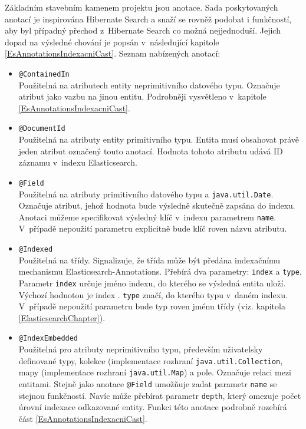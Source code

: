 \documentclass[11pt,oneside]{fithesis2}
\begin{document}
Základním stavebním kamenem projektu jsou anotace. Sada poskytovaných anotací je inspirována Hibernate Search a snaží se rovněž podobat i funkčností, aby byl případný přechod z~Hibernate Search co možná nejjednoduší. Jejich dopad na výsledné chování je popsán v~následující kapitole \ref{EsAnnotationsIndexacniCast}. Seznam nabízených anotací:
\begin{itemize}
	\item \texttt{@ContainedIn} \\
	Použitelná na atributech entity neprimitivního datového typu. Označuje atribut jako vazbu na jinou entitu. Podrobněji vysvětleno v~kapitole \ref{EsAnnotationsIndexacniCast}.

	\item \texttt{@DocumentId} \\
	Použitelná na atributy entity primitivního typu. Entita musí obsahovat právě jeden atribut označený touto anotací. Hodnota tohoto atributu udává ID záznamu v~indexu Elasticsearch.

	\item \texttt{@Field} \\
	Použitelná na atributy primitivního datového typu a \texttt{java.util.Date}. Označuje atribut, jehož hodnota bude výsledně skutečně zapsána do indexu. Anotaci můžeme specifikovat výsledný klíč v~indexu parametrem \texttt{name}. V~případě nepoužití parametru explicitně bude klíč roven názvu atributu.

	\item \texttt{@Indexed} \\
	Použitelná na třídy. Signalizuje, že třída může být předána indexačnímu mechanismu Elasticsearch-Annotations. Přebírá dva parametry: \texttt{index} a \texttt{type}. Parametr \texttt{index} určuje jméno indexu, do kterého se výsledná entita uloží. Výchozí hodnotou je 	index . \texttt{type} značí, do kterého typu v~daném indexu. V~případě nepoužití parametru bude typ roven jménu třídy (viz. kapitola \ref{ElasticsearchChapter}).

	\item \texttt{@IndexEmbedded} \\
	Použitelná pro atributy neprimitivního typu, především uživatelsky definované typy, kolekce (implementace rozhraní \texttt{java.util.Collection}, mapy (implementace rozhraní \texttt{java.util.Map}) a pole. Označuje relaci mezi entitami. Stejně jako anotace \texttt{@Field} umožňuje zadat parametr \texttt{name} se stejnou funkčností. Navíc může přebírat parametr \texttt{depth}, který omezuje počet úrovní indexace odkazované entity. Funkci této anotace podrobně rozebírá část \ref{EsAnnotationsIndexacniCast}.
\end{itemize}
\end{document}
